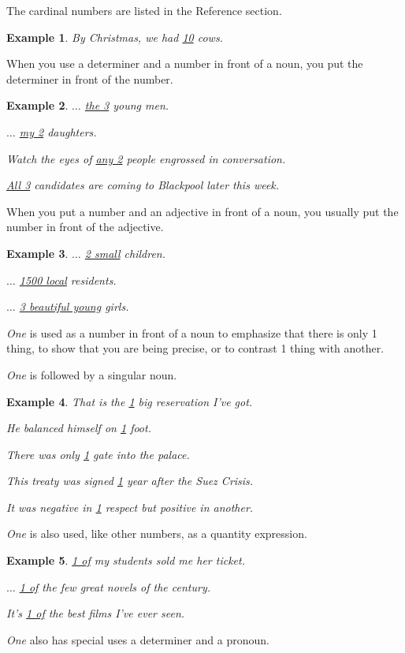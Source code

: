 \documentclass[oneside]{book}
\numberwithin{equation}{section}
\newtheorem{example}{Example}[section]
\begin{document}
%
The cardinal numbers are listed in the Reference section.
\begin{example}
    By Christmas, we had \underline{10} cows.
\end{example}
When you use a determiner and a number in front of a noun, you put the determiner in front of the number.
\begin{example}
    $\ldots$ \underline{the 3} young men.
    
    $\ldots$ \underline{my 2} daughters.
    
    Watch the eyes of \underline{any 2} people engrossed in conversation.
    
    \underline{All 3} candidates are coming to Blackpool later this week.
\end{example}
When you put a number and an adjective in front of a noun, you usually put the number in front of the adjective.
\begin{example}
    $\ldots$ \underline{2 small} children.
    
    $\ldots$ \underline{1500 local} residents.
    
    $\ldots$ \underline{3 beautiful young} girls.
\end{example}
%
\noindent{} \textit{One} is used as a number in front of a noun to emphasize that there is only 1 thing, to show that you are being precise, or to contrast 1 thing with another.

\textit{One} is followed by a singular noun.
\begin{example}
    That is the \underline{1} big reservation I've got.
    
    He balanced himself on \underline{1} foot.
    
    There was only \underline{1} gate into the palace.
    
    This treaty was signed \underline{1} year after the Suez Crisis.
    
    It was negative in \underline{1} respect but positive in another. 
\end{example}
\textit{One} is also used, like other numbers, as a quantity expression.
\begin{example}
    \underline{1 of} my students sold me her ticket.
    
    $\ldots$ \underline{1 of} the few great novels of the century.
    
    It's \underline{1 of} the best films I've ever seen.
\end{example}
\textit{One} also has special uses a determiner and a pronoun.
\end{document}
